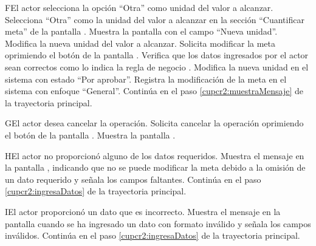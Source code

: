 \begin{UCtrayectoriaA}{F}{El actor selecciona la opción ``Otra'' como unidad del valor a alcanzar.}
	\UCpaso[\UCactor] Selecciona ``Otra'' como la unidad del valor a alcanzar en la sección ``Cuantificar meta'' de la pantalla .
	\UCpaso[\UCsist] Muestra la pantalla   con el campo ``Nueva unidad''.
	\UCpaso[\UCactor] Modifica la nueva unidad del valor a alcanzar.
	\UCpaso[\UCactor] Solicita modificar la meta oprimiendo el botón  de la pantalla .  
	\UCpaso[\UCsist] Verifica que los datos ingresados por el actor sean correctos como lo indica la regla de negocio .   
	\UCpaso[\UCsist] Modifica la nueva unidad en el sistema con estado ``Por aprobar''.
	\UCpaso[\UCsist] Registra la modificación de la meta en el sistema con enfoque ``General''.
	\UCpaso[] Continúa en el paso \ref{cupcr2:muestraMensaje} de la trayectoria principal.
\end{UCtrayectoriaA} 

\begin{UCtrayectoriaA}{G}{El actor desea cancelar la operación.}
	\UCpaso[\UCactor] Solicita cancelar la operación oprimiendo el botón  de la pantalla .
	\UCpaso[\UCsist] Muestra la pantalla  .
\end{UCtrayectoriaA} 

\begin{UCtrayectoriaA}{H}{El actor no proporcionó alguno de los datos requeridos.}
	\UCpaso[\UCsist] Muestra el mensaje  en la pantalla ,
	indicando que no se puede modificar la meta debido a la omisión de un dato requerido y señala los campos faltantes.
	\UCpaso[] Continúa en el paso \ref{cupcr2:ingresaDatos} de la trayectoria principal.
\end{UCtrayectoriaA}

\begin{UCtrayectoriaA}{I}{El actor proporcionó un dato que es incorrecto.}
	\UCpaso[\UCsist] Muestra el mensaje  en la pantalla 
	cuando se ha ingresado un dato con formato inválido y señala los campos inválidos.
	\UCpaso[] Continúa en el paso \ref{cupcr2:ingresaDatos} de la trayectoria principal.
\end{UCtrayectoriaA}
 
